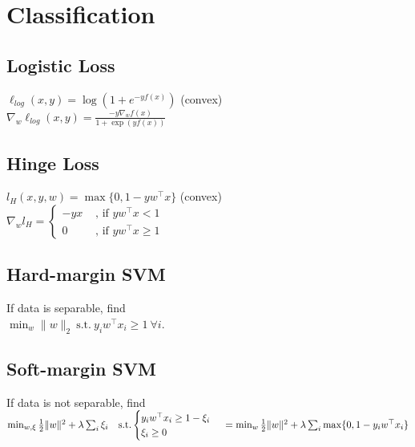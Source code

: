 \section*{Classification}
\subsection*{Logistic Loss}
$\ell_{log}(x,y) = \log(1+e^{-yf(x)})$ (convex)\\
$\nabla_w \ell_{log}(x,y) = \frac{-y\nabla_w f(x)}{1+\exp(yf(x))} $

\subsection*{Hinge Loss}
$l_H(x,y,w) = \max \{0,1-y w^\top x\}$ (convex)\\
$\nabla_w l_H = \begin{cases}
    -y x&\text{ , if $yw^\top x<1$}\\
	0 &\text{ , if $y w^\top x \geq 1$}
\end{cases}$

\subsection*{Hard-margin SVM}
If data is separable, find \\
$\min_w \lVert w \rVert_2 \ \text{s.t.} \ y_iw^\top x_i\geq 1 \ \forall i.$\\

\subsection*{Soft-margin SVM}
If data is not separable, find \\
$\min_{w,\xi}\frac{1}{2}\|w\|^2  +\lambda\sum_i\xi_i\ \ \ 
\text{s.t.} \begin{cases}
    y_iw^\top x_i\geq 1-\xi_i\\
    \xi_i\geq0
\end{cases}\\
=\min_w\frac{1}{2}\|w\|^2+\lambda\sum_i\max \{0,1-y_i w^\top x_i\}$


